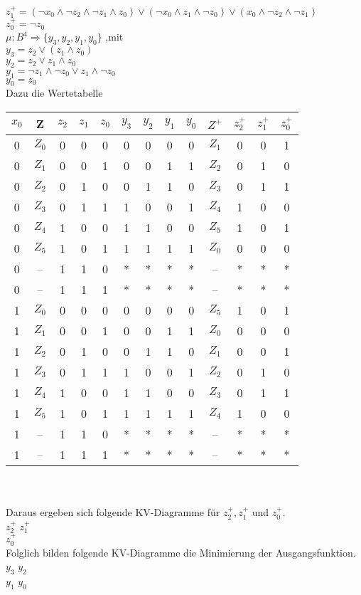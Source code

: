 \documentclass[11pt,a4paper]{article}
\begin{document}
$z^+_1= (\neg x_0 \wedge \neg z_2 \wedge \neg z_1 \wedge z_0 ) \vee ( \neg x_0 \wedge z_1 \wedge \neg z_0) \vee ( x_0 \wedge \neg z_2 \wedge \neg z_1) $\\
$z^+_0= \neg z_0$ \\
$\mu :B^4 \Rightarrow \lbrace y_3,y_2,y_1,y_0 \rbrace$ ,mit\\
$y_3=z_2 \vee (z_1 \wedge z_0 )$\\
$y_2=z_2 \vee z_1 \wedge z_0 $\\
$y_1= \neg z_1 \wedge \neg z_0 \vee z_1 \wedge \neg z_0$\\
$y_0= z_0$\\ \newpage
Dazu die Wertetabelle \\
\begin{tabular}{c | c | c | c | c | | c | c | c | c | | c | c | c | c}
$x_0$&Z&$z_2$&$z_1$&$z_0$&$y_3$&$y_2$&$y_1$&$y_0$&$Z^+$&$z^+_2$&$z^+_1$&$z^+_0$ \\ \hline
0&$Z_0$&0&0&0&0&0&0&0&$Z_1$&0&0&1\\
0&$Z_1$&0&0&1&0&0&1&1&$Z_2$&0&1&0\\
0&$Z_2$&0&1&0&0&1&1&0&$Z_3$&0&1&1\\
0&$Z_3$&0&1&1&1&0&0&1&$Z_4$&1&0&0\\
0&$Z_4$&1&0&0&1&1&0&0&$Z_5$&1&0&1\\
0&$Z_5$&1&0&1&1&1&1&1&$Z_0$&0&0&0\\
0&--&1&1&0&*&*&*&*&--&*&*&*\\
0&--&1&1&1&*&*&*&*&--&*&*&*\\ \hline
1&$Z_0$&0&0&0&0&0&0&0&$Z_5$&1&0&1\\
1&$Z_1$&0&0&1&0&0&1&1&$Z_0$&0&0&0\\
1&$Z_2$&0&1&0&0&1&1&0&$Z_1$&0&0&1\\
1&$Z_3$&0&1&1&1&0&0&1&$Z_2$&0&1&0\\
1&$Z_4$&1&0&0&1&1&0&0&$Z_3$&0&1&1\\
1&$Z_5$&1&0&1&1&1&1&1&$Z_4$&1&0&0\\
1&--&1&1&0&*&*&*&*&--&*&*&*\\
1&--&1&1&1&*&*&*&*&--&*&*&*\\
\end{tabular}\\
\\
Daraus ergeben sich folgende KV-Diagramme für $z^+_2,z^+_1$ und $z^+_0$.\\
$z^+_2$
$z^+_1$
\\
$z^+_0$
\\ \newpage
Folglich bilden folgende KV-Diagramme die Minimierung der Ausgangsfunktion.\\
$y_3$
$y_2$
\\
$y_1$
$y_0$
\\ 
\end{document}
